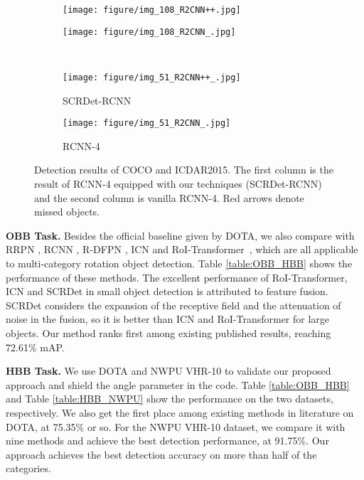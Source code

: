\documentclass[10pt,twocolumn,letterpaper]{article}
\begin{document}
	\begin{figure}[!tb]
		\vspace{-10pt}
		\centering
		\begin{subfigure}{.23\textwidth}
			\centering
			\texttt{[image: figure/img\_108\_R2CNN++.jpg]}
			\caption{}
			\label{fig:img_108_R2CNN++}
		\end{subfigure}
		\begin{subfigure}{.23\textwidth}
			\centering
			\texttt{[image: figure/img\_108\_R2CNN\_.jpg]}
			\caption{}
			\label{fig:img_108_R2CNN_}
		\end{subfigure} \\
		\vspace{-10pt}
		\begin{subfigure}{.23\textwidth}
			\centering
			\texttt{[image: figure/img\_51\_R2CNN++\_.jpg]}
			\caption*{SCRDet-RCNN}
			\label{fig:img_51_R2CNN++_}
		\end{subfigure}
		\begin{subfigure}{.23\textwidth}
			\centering
			\texttt{[image: figure/img\_51\_R2CNN\_.jpg]}
			\caption*{RCNN-4}
			\label{fig:img_51_R2CNN_}
		\end{subfigure}
		\vspace{-10pt}
		\caption{Detection results of COCO and ICDAR2015. The first column is the result of RCNN-4 equipped with our techniques (SCRDet-RCNN) and the second column is vanilla RCNN-4. Red arrows denote missed objects.}
		\label{fig:icdar2015}
	\end{figure}
	
	{\bf \quad OBB Task.} Besides the official baseline given by DOTA, we also compare with RRPN \cite{ma2018arbitrary}, RCNN \cite{jiang2017r2cnn}, R-DFPN \cite{yang2018automatic}, ICN \cite{azimi2018towards} and RoI-Transformer~\cite{ding2018learning}, which are all applicable to multi-category rotation object detection. Table \ref{table:OBB_HBB} shows the performance of these methods. The excellent performance of RoI-Transformer, ICN and SCRDet in small object detection is attributed to feature fusion. SCRDet considers the expansion of the receptive field and the attenuation of noise in the fusion, so it is better than ICN and RoI-Transformer for large objects. Our method ranks first among existing published results, reaching 72.61\% mAP.
	
	{\bf HBB Task.} We use DOTA and NWPU VHR-10 to validate our proposed approach and shield the angle parameter in the code. Table \ref{table:OBB_HBB} and Table \ref{table:HBB_NWPU} show the performance on the two datasets, respectively. We also get the first place among existing methods in literature on DOTA, at 75.35\% or so. For the NWPU VHR-10 dataset, we compare it with nine methods and achieve the best detection performance, at 91.75\%. Our approach achieves the best detection accuracy on more than half of the categories. 
\end{document}
